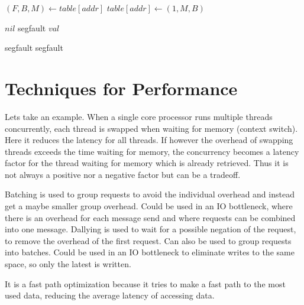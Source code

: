 \documentclass[a4paper, 11pt]{article}
\begin{document}
\begin{algorithmic}
    \State $(F, B, M) \gets table[addr]$
    \State {}
    \State $table[addr] \gets (1, M, B)$
\EndFunction
\end{algorithmic}

\begin{algorithmic}
    \State {}
    \State {}
    \State {}
        \State \Return $nil$
        \State segfault
        \State \Return $val$
    \EndIf
\EndFunction
\end{algorithmic}

\begin{algorithmic}
    \State {}
    \State {}
    \State {}
        \State segfault
        \State segfault
        \State \Return
    \EndIf
\EndFunction
\end{algorithmic}


\section{Techniques for Performance} %
\label{sec:techniques_for_performance}

Lets take an example. When a single core processor runs multiple threads concurrently, each thread is swapped when waiting for memory (context switch). Here it reduces the latency for all threads. If however the overhead of swapping threads exceeds the time waiting for memory, the concurrency becomes a latency factor for the thread waiting for memory which is already retrieved. Thus it is not always a positive nor a negative factor but can be a tradeoff.

Batching is used to group requests to avoid the individual overhead and instead get a maybe smaller group overhead. Could be used in an IO bottleneck, where there is an overhead for each message send and where requests can be combined into one message.%
Dallying is used to wait for a possible negation of the request, to remove the overhead of the first request. Can also be used to group requests into batches. Could be used in an IO bottleneck to eliminate writes to the same space, so only the latest is written.

It is a fast path optimization because it tries to make a fast path to the most used data, reducing the average latency of accessing data.

\end{document}
